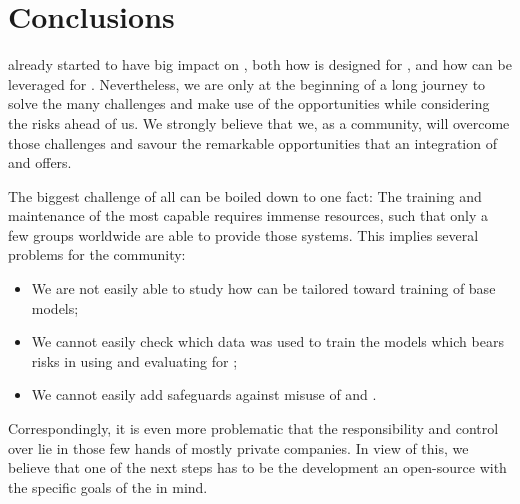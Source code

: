 \section{Conclusions}
\label{llm-sec:conclusion}

\LLMs already started to have big impact on \AutoML, both how \AutoML is designed for \LLMs, and how \LLMs can be leveraged for \AutoML. 
Nevertheless, we are only at the beginning of a long journey to solve the many challenges and make use of the opportunities while considering the risks ahead of us. We strongly believe that we, as a community, will overcome those challenges and savour the remarkable opportunities that an integration of \LLMs and \AutoML offers.

The biggest challenge of all can be boiled down to one fact: The training and maintenance of the most capable \LLMs requires immense resources, such that only a few groups worldwide are able to provide those systems. This implies several problems for the community: \begin{itemize}
    \item We are not easily able to study how \AutoML can be tailored toward training of \LLM base models;
    \item We cannot easily check which data was used to train the models which bears risks in using and evaluating \LLMs for \AutoML;
    \item We cannot easily add safeguards against misuse of \LLMs and \AutoML.
\end{itemize}
Correspondingly, it is even more problematic that the responsibility and control over \LLMs lie in those few hands of mostly private companies. In view of this, we believe that one of the next steps has to be the development an open-source \LLM with the specific goals of the \AutoML in mind.
